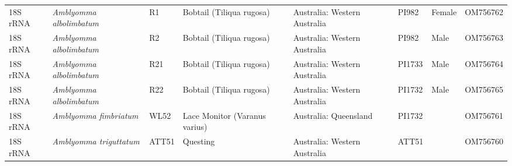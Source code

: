 \documentclass[a4paper, nobind]{templates/ociamthesis}
\begin{document}
\begin{landscape}
\begin{longtable}[t]{l>{}lllllll}
18S rRNA & \em{Amblyomma albolimbatum} & R1 & Bobtail (Tiliqua rugosa) & Australia: Western Australia & PI982 & Female & OM756762\\
18S rRNA & \em{Amblyomma albolimbatum} & R2 & Bobtail (Tiliqua rugosa) & Australia: Western Australia & PI982 & Male & OM756763\\
18S rRNA & \em{Amblyomma albolimbatum} & R21 & Bobtail (Tiliqua rugosa) & Australia: Western Australia & PI1733 & Male & OM756764\\
18S rRNA & \em{Amblyomma albolimbatum} & R22 & Bobtail (Tiliqua rugosa) & Australia: Western Australia & PI1732 & Male & OM756765\\
18S rRNA & \em{Amblyomma fimbriatum} & WL52 & Lace Monitor (Varanus varius) & Australia: Queensland & PI1732 &  & OM756761\\
18S rRNA & \em{Amblyomma triguttatum} & ATT51 & Questing & Australia: Western Australia & ATT51 &  & OM756760\\*
\end{longtable}
\endgroup{}
\end{landscape}

\newpage

\begingroup\fontsize{7.5}{9.5}\selectfont
\end{document}
